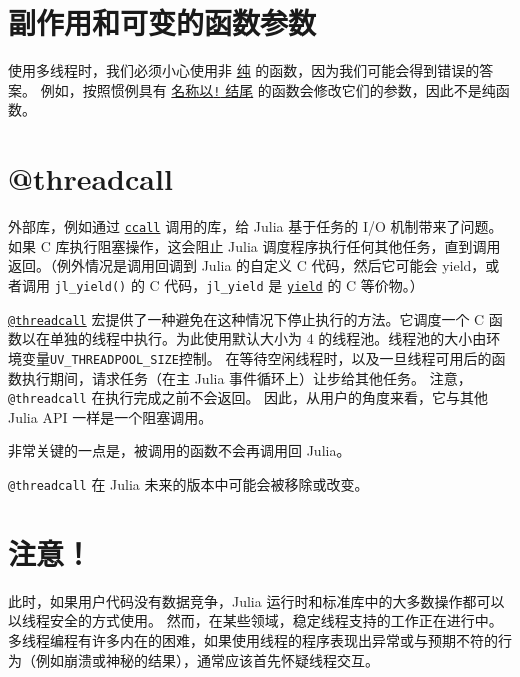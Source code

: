 \section{副作用和可变的函数参数}



使用多线程时，我们必须小心使用非 \href{https://en.wikipedia.org/wiki/Pure\_function}{纯} 的函数，因为我们可能会得到错误的答案。 例如，按照惯例具有 \hyperlink{8429867064470859454}{名称以\texttt{!} 结尾} 的函数会修改它们的参数，因此不是纯函数。



\hypertarget{16383628308663463272}{}


\section{@threadcall}



外部库，例如通过 \hyperlink{14245046751182637566}{\texttt{ccall}} 调用的库，给 Julia 基于任务的 I/O 机制带来了问题。 如果 C 库执行阻塞操作，这会阻止 Julia 调度程序执行任何其他任务，直到调用返回。（例外情况是调用回调到 Julia 的自定义 C 代码，然后它可能会 yield，或者调用 \texttt{jl\_yield()} 的 C 代码，\texttt{jl\_yield} 是 \hyperlink{13455314829114364187}{\texttt{yield}} 的 C 等价物。）



\hyperlink{4118169676263419404}{\texttt{@threadcall}} 宏提供了一种避免在这种情况下停止执行的方法。它调度一个 C 函数以在单独的线程中执行。为此使用默认大小为 4 的线程池。线程池的大小由环境变量\texttt{UV\_THREADPOOL\_SIZE}控制。 在等待空闲线程时，以及一旦线程可用后的函数执行期间，请求任务（在主 Julia 事件循环上）让步给其他任务。 注意，\texttt{@threadcall} 在执行完成之前不会返回。 因此，从用户的角度来看，它与其他 Julia API 一样是一个阻塞调用。



非常关键的一点是，被调用的函数不会再调用回 Julia。



\texttt{@threadcall} 在 Julia 未来的版本中可能会被移除或改变。



\hypertarget{16893517570550920968}{}


\section{注意！}



此时，如果用户代码没有数据竞争，Julia 运行时和标准库中的大多数操作都可以以线程安全的方式使用。 然而，在某些领域，稳定线程支持的工作正在进行中。多线程编程有许多内在的困难，如果使用线程的程序表现出异常或与预期不符的行为（例如崩溃或神秘的结果），通常应该首先怀疑线程交互。



